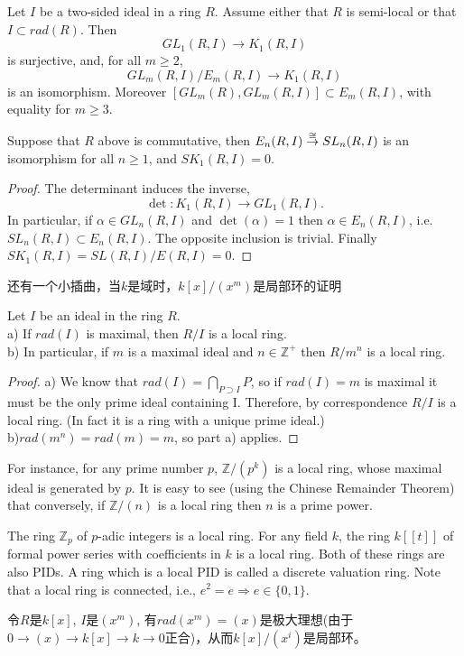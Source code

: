 \begin{theorem}
	Let $I$ be a two-sided ideal in a ring $R$. Assume either that $R$ is semi-local or that $I\subset rad(R)$. Then 
	\[GL_1(R,I)\longrightarrow K_1(R,I)\]
	is surjective, and, for all $m\geq 2$,
	\[GL_m(R,I)/E_m(R,I)\longrightarrow K_1(R,I)\]
	is an isomorphism. Moreover $[GL_m(R),GL_m(R,I)]\subset E_m(R,I)$, with equality for $m\geq 3$.
\end{theorem}
\begin{corollary}
	Suppose that $R$ above is commutative, then $E_n(R,I)\overset{\cong}{\to} SL_n(R,I)$ is an isomorphism for all $n\geq 1$, and $SK_1(R,I)=0$.
\end{corollary}
\begin{proof}
	The determinant induces the inverse, 
	\[\det \colon K_1(R,I)\longrightarrow GL_1(R,I).\]
	In particular, if $\alpha\in GL_n(R,I)$ and $\det(\alpha)=1$ then $\alpha \in E_n(R,I)$, i.e. $SL_n(R,I)\subset E_n(R,I)$. The opposite inclusion is trivial. Finally $SK_1(R,I)=SL(R,I)/E(R,I)=0$.
\end{proof}

还有一个小插曲，当$k$是域时，$k[x]/(x^m)$是局部环的证明
\begin{prop}
	 Let $I$ be an ideal in the ring $R$.\\
a) If $rad(I)$ is maximal, then $R/I$ is a local ring.\\
b) In particular, if $m$ is a maximal ideal and $n \in \mathbb{Z}^+$ then $R/m^n$ is a local ring.
\end{prop}
\begin{proof}
a) We know that $rad(I)=\bigcap_{P\supset I}P$, so if $rad(I) = m$ is maximal it must be the only prime ideal containing I. Therefore, by correspondence $R/I$ is a local ring. (In fact it is a ring with a unique prime ideal.)\\
b)$rad(m^n) = rad(m) = m$, so part a) applies. 
\end{proof}


\begin{example}
	For instance, for any prime number $p$, $\mathbb{Z}/(p^k)$ is a local ring, whose maximal ideal is generated by $p$. It is easy to see (using the Chinese Remainder Theorem) that conversely, if $\mathbb{Z}/(n)$ is a local ring then $n$ is a prime power. 

	The ring $\mathbb{Z}_p$ of $p$-adic integers is a local ring. For any field $k$, the ring $k[[t]]$ of formal power series with coefficients in $k$ is a local ring. Both of these rings are also PIDs. A ring which is a local PID is called a discrete valuation ring. Note that a local ring is connected, i.e., $e^2 = e \Rightarrow e \in \{0,1\}$.

令$R$是$k[x]$, $I$是$(x^m)$, 有$rad(x^m)=(x)$是极大理想(由于$0\rightarrow (x) \rightarrow k[x]\rightarrow k \rightarrow 0$正合)，从而$k[x]/(x^i)$是局部环。
\end{example}



